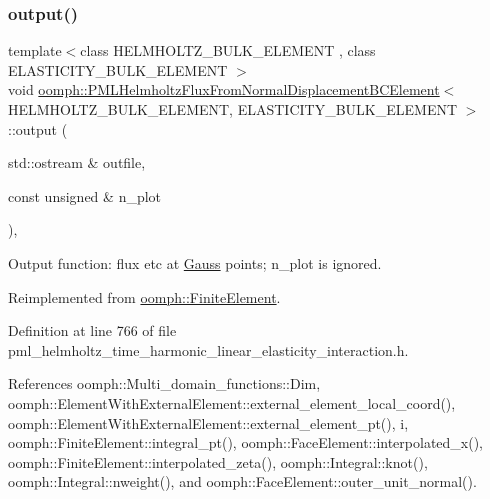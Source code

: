 \subsubsection{\texorpdfstring{output()}{output()}\hspace{0.1cm}{\footnotesize\ttfamily [2/4]}}
{\footnotesize\ttfamily template$<$class H\+E\+L\+M\+H\+O\+L\+T\+Z\+\_\+\+B\+U\+L\+K\+\_\+\+E\+L\+E\+M\+E\+NT , class E\+L\+A\+S\+T\+I\+C\+I\+T\+Y\+\_\+\+B\+U\+L\+K\+\_\+\+E\+L\+E\+M\+E\+NT $>$ \\
void \hyperlink{classoomph_1_1PMLHelmholtzFluxFromNormalDisplacementBCElement}{oomph\+::\+P\+M\+L\+Helmholtz\+Flux\+From\+Normal\+Displacement\+B\+C\+Element}$<$ H\+E\+L\+M\+H\+O\+L\+T\+Z\+\_\+\+B\+U\+L\+K\+\_\+\+E\+L\+E\+M\+E\+NT, E\+L\+A\+S\+T\+I\+C\+I\+T\+Y\+\_\+\+B\+U\+L\+K\+\_\+\+E\+L\+E\+M\+E\+NT $>$\+::output (\begin{DoxyParamCaption}\item[{std\+::ostream \&}]{outfile,  }\item[{const unsigned \&}]{n\+\_\+plot }\end{DoxyParamCaption})\hspace{0.3cm}{\ttfamily [inline]}, {\ttfamily [virtual]}}



Output function\+: flux etc at \hyperlink{classoomph_1_1Gauss}{Gauss} points; n\+\_\+plot is ignored. 



Reimplemented from \hyperlink{classoomph_1_1FiniteElement_afa9d9b2670f999b43e6679c9dd28c457}{oomph\+::\+Finite\+Element}.



Definition at line 766 of file pml\+\_\+helmholtz\+\_\+time\+\_\+harmonic\+\_\+linear\+\_\+elasticity\+\_\+interaction.\+h.



References oomph\+::\+Multi\+\_\+domain\+\_\+functions\+::\+Dim, oomph\+::\+Element\+With\+External\+Element\+::external\+\_\+element\+\_\+local\+\_\+coord(), oomph\+::\+Element\+With\+External\+Element\+::external\+\_\+element\+\_\+pt(), i, oomph\+::\+Finite\+Element\+::integral\+\_\+pt(), oomph\+::\+Face\+Element\+::interpolated\+\_\+x(), oomph\+::\+Finite\+Element\+::interpolated\+\_\+zeta(), oomph\+::\+Integral\+::knot(), oomph\+::\+Integral\+::nweight(), and oomph\+::\+Face\+Element\+::outer\+\_\+unit\+\_\+normal().

\mbox{\label{classoomph_1_1PMLHelmholtzFluxFromNormalDisplacementBCElement_a357bf237c7b8a0d421851a6e8f93a9b6}} 

